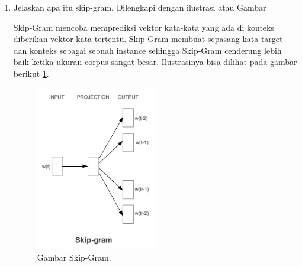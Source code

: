 \begin{enumerate}
\item Jelaskan apa itu skip-gram. Dilengkapi dengan ilustrasi atau Gambar
\par Skip-Gram mencoba memprediksi vektor kata-kata yang ada di konteks diberikan vektor kata tertentu. Skip-Gram membuat sepasang kata target dan konteks sebagai sebuah instance sehingga Skip-Gram cenderung lebih baik ketika ukuran corpus sangat besar.  Ilustrasinya bisa dilihat pada gambar berikut  \ref{no6}.
\begin{figure}[ht]
\centerline{\includegraphics[width=0.5\textwidth]{figures/AFS/no6.png}}
\caption{Gambar Skip-Gram.}
\label{no6}
\end{figure}

\end{enumerate}